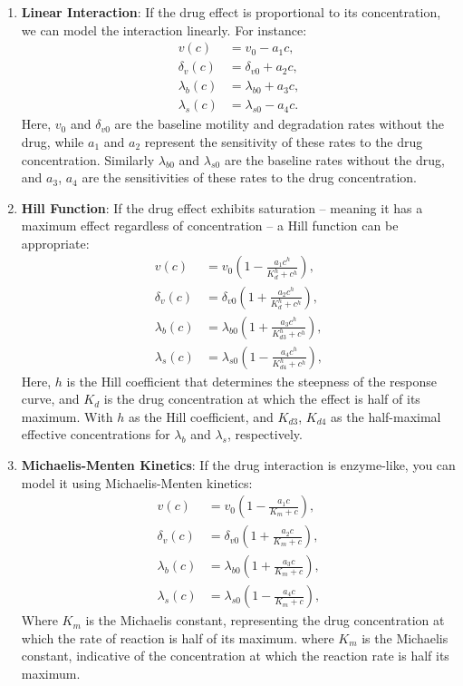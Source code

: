 \begin{enumerate}
	\item \textbf{Linear Interaction}: If the drug effect is proportional to its concentration, we can model the interaction linearly. For instance:
	\begin{align*}
		v(c) &= v_0 - a_1 c, \\
		\delta_v(c) &= \delta_{v0} + a_2 c,\\
		\lambda_b(c) &= \lambda_{b0} + a_3 c,\\
		\lambda_s(c) &= \lambda_{s0} - a_4 c.
	\end{align*}
	Here, \( v_0 \) and \( \delta_{v0} \) are the baseline motility and degradation rates without the drug, while \( a_1 \) and \( a_2 \) represent the sensitivity of these rates to the drug concentration. Similarly \( \lambda_{b0} \) and \( \lambda_{s0} \) are the baseline rates without the drug, and \( a_3 \), \( a_4 \) are the sensitivities of these rates to the drug concentration.

	
	\item \textbf{Hill Function}: If the drug effect exhibits saturation -- meaning it has a maximum effect regardless of concentration -- a Hill function can be appropriate:
	\begin{align*}
		v(c) &= v_0 \left(1 - \frac{a_1 c^h}{K_d^h + c^h}\right), \\
		\delta_v(c) &= \delta_{v0} \left(1 + \frac{a_2 c^h}{K_d^h + c^h}\right),\\
		\lambda_b(c) &= \lambda_{b0} \left(1 + \frac{a_3 c^h}{K_{d3}^h + c^h}\right),\\
		\lambda_s(c)& = \lambda_{s0} \left(1 - \frac{a_4 c^h}{K_{d4}^h + c^h}\right),
	\end{align*}
	Here, \( h \) is the Hill coefficient that determines the steepness of the response curve, and \( K_d \) is the drug concentration at which the effect is half of its maximum. With \( h \) as the Hill coefficient, and \( K_{d3} \), \( K_{d4} \) as the half-maximal effective concentrations for \( \lambda_b \) and \( \lambda_s \), respectively.
	
	\item \textbf{Michaelis-Menten Kinetics}: If the drug interaction is enzyme-like, you can model it using Michaelis-Menten kinetics:
	\begin{align*}
		v(c) &= v_0 \left(1 - \frac{a_1 c}{K_m + c}\right), \\
		\delta_v(c) &= \delta_{v0} \left(1 + \frac{a_2 c}{K_m + c}\right),\\
		\lambda_b(c) &= \lambda_{b0} \left(1 + \frac{a_3 c}{K_m + c}\right),\\	
		\lambda_s(c) &= \lambda_{s0} \left(1 - \frac{a_4 c}{K_m + c}\right),
	\end{align*}
	Where \( K_m \) is the Michaelis constant, representing the drug concentration at which the rate of reaction is half of its maximum. where \( K_m \) is the Michaelis constant, indicative of the concentration at which the reaction rate is half its maximum.
	

\end{enumerate}
